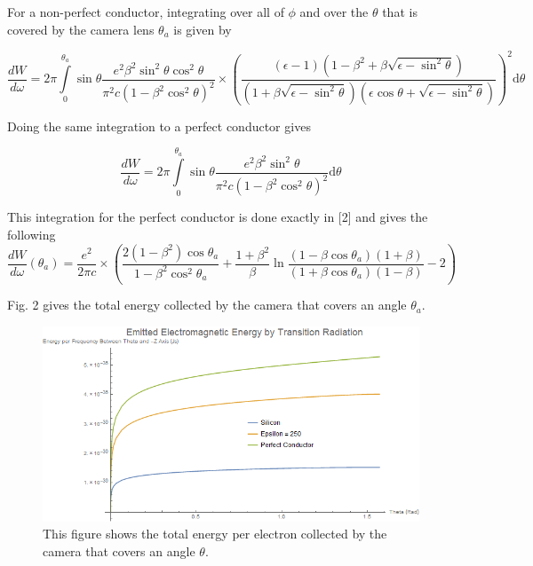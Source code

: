 \documentclass[12pt]{article}
\begin{document}
For a non-perfect conductor, integrating over all of $\phi$ and over the $\theta$ that is covered by the camera lens $\theta_a$ is given by

\begin{equation}
\frac{dW} {d \omega} =2 \pi \int\limits_0^{\theta_{a}} \sin \theta \frac{e^{2} \beta^{2} \sin^2 \theta \cos^2 \theta} {\pi^{2} c (1-\beta^{2} \cos^2 \theta)^{2}} \times (\frac{(\epsilon -1) (1-\beta^{2}+\beta \sqrt{\epsilon-\sin^2 \theta})} {(1+\beta \sqrt{\epsilon-\sin^2 \theta}) (\epsilon \cos \theta + \sqrt{\epsilon- \sin^2 \theta})})^{2} \mathrm{d} \theta
\end{equation}

Doing the same integration to a perfect conductor gives

\begin{equation}
\frac{dW} {d \omega} =2 \pi \int\limits_0^{\theta_{a}} \sin \theta \frac{e^{2} \beta^{2} \sin^2 \theta} {\pi^{2} c (1-\beta^{2} \cos^2 \theta)^{2}} \mathrm{d} \theta
\end{equation}

This integration for the perfect conductor is done exactly in [2] and gives the following
\begin{equation}
\frac{dW} {d \omega} (\theta_{a}) =\frac{e^{2}} {2 \pi c} \times (\frac{2(1-\beta^{2}) \cos \theta_{a}}{1-\beta^2 \cos^2 \theta_{a}}+\frac{1+\beta^{2}}{\beta} \ln{\frac{(1-\beta \cos \theta_{a})(1+\beta)}{(1+\beta \cos \theta_{a})(1-\beta)}}-2)
\end{equation}

Fig. 2 gives the total energy collected by the camera that covers an angle $\theta_a$.

\begin{figure}
\begin{center}
\includegraphics[scale=0.5]{Energy2.PNG}
\caption{This figure shows the total energy per electron collected by the camera that covers an angle $\theta$.}
\end{center}
\end{figure}
\end{document}
